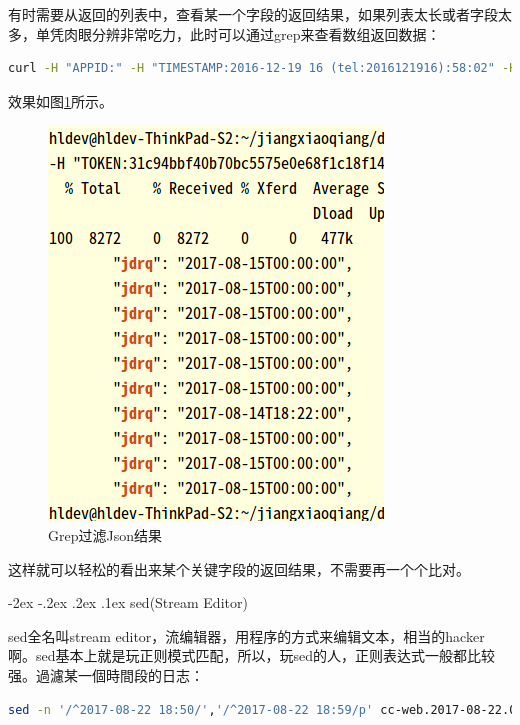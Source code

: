 \documentclass[12pt]{book}
\makeatletter
\numberwithin{dummy}{section}
\theoremstyle{ocrenumbox}
\theoremstyle{blacknumex}
\theoremstyle{blacknumbox}
\theoremstyle{ocrenum}
\renewcommand\paragraph{\@startsection{paragraph}{4}{\z@}
	{-2ex \@plus-.2ex \@minus .2ex}
	{.1ex}
	{\normalfont\small\sffamily\bfseries}}
\makeatother
\begin{document}
有时需要从返回的列表中，查看某一个字段的返回结果，如果列表太长或者字段太多，单凭肉眼分辨非常吃力，此时可以通过grep来查看数组返回数据：

\begin{lstlisting}[language=Bash]
curl -H "APPID:" -H "TIMESTAMP:2016-12-19 16 (tel:2016121916):58:02" -H "ECHOSTR:" -H "TOKEN:" http://10.10.1.12:28080/api/xzxk?xdr= | jq '.' |grep jdrq
\end{lstlisting}

效果如图\ref{fig:grepfilterreturnvalue}所示。

\begin{figure}[htbp]
	\centering
	\includegraphics[scale=0.5]{grepfilterreturnvalue.png}
	\caption{Grep过滤Json结果}
	\label{fig:grepfilterreturnvalue}
\end{figure}

这样就可以轻松的看出来某个关键字段的返回结果，不需要再一个个比对。

\paragraph{sed(Stream Editor)}

sed全名叫stream editor，流编辑器，用程序的方式来编辑文本，相当的hacker啊。sed基本上就是玩正则模式匹配，所以，玩sed的人，正则表达式一般都比较强。過濾某一個時間段的日志：

\begin{lstlisting}[language=Bash]
sed -n '/^2017-08-22 18:50/','/^2017-08-22 18:59/p' cc-web.2017-08-22.0.log >> filter.log
\end{lstlisting}
\end{document}
